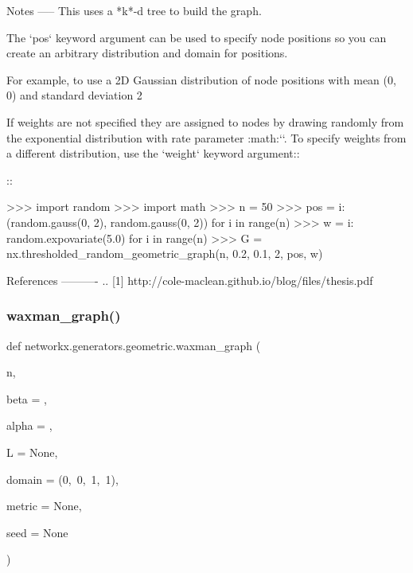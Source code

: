 \begin{DoxyVerb}
Notes
-----
This uses a *k*-d tree to build the graph.

The `pos` keyword argument can be used to specify node positions so you
can create an arbitrary distribution and domain for positions.

For example, to use a 2D Gaussian distribution of node positions with mean
(0, 0) and standard deviation 2

If weights are not specified they are assigned to nodes by drawing randomly
from the exponential distribution with rate parameter :math:``.
To specify weights from a different distribution, use the `weight` keyword
argument::

::

>>> import random
>>> import math
>>> n = 50
>>> pos = {i: (random.gauss(0, 2), random.gauss(0, 2)) for i in range(n)}
>>> w = {i: random.expovariate(5.0) for i in range(n)}
>>> G = nx.thresholded_random_geometric_graph(n, 0.2, 0.1, 2, pos, w)

References
----------
.. [1] http://cole-maclean.github.io/blog/files/thesis.pdf\end{DoxyVerb}
 \mbox{\label{namespacenetworkx_1_1generators_1_1geometric_a9714b30e53e8104685d8b550db52e705}} 
\subsubsection{\texorpdfstring{waxman\+\_\+graph()}{waxman\_graph()}}
{\footnotesize\ttfamily def networkx.\+generators.\+geometric.\+waxman\+\_\+graph (\begin{DoxyParamCaption}\item[{}]{n,  }\item[{}]{beta = {},  }\item[{}]{alpha = {},  }\item[{}]{L = {\ttfamily None},  }\item[{}]{domain = {\ttfamily (0,~0,~1,~1)},  }\item[{}]{metric = {\ttfamily None},  }\item[{}]{seed = {\ttfamily None} }\end{DoxyParamCaption})}

